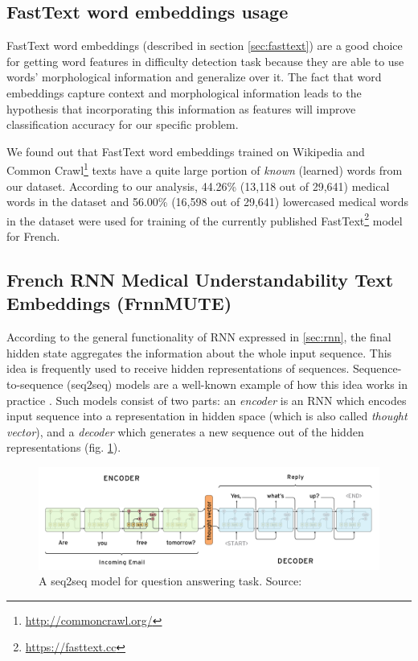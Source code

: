 \subsection{FastText word embeddings usage}

FastText word embeddings (described in section \ref{sec:fasttext}) are a good choice for getting word features in difficulty detection task because they are able to use words' morphological information and generalize over it. The fact that word embeddings capture context and morphological information leads to the hypothesis that incorporating this information as features will improve classification accuracy for our specific problem. 

We found out that FastText word embeddings trained on Wikipedia and Common Crawl\footnote{\url{http://commoncrawl.org/}} texts have a quite large portion of \textit{known} (learned) words from our dataset.
According to our analysis, 44.26\% (13,118 out of 29,641) medical words in the dataset and 56.00\% (16,598 out of 29,641) lowercased medical words in the dataset were used for training of the currently published FastText\footnote{\url{https://fasttext.cc}} model for French.

\subsection{French RNN Medical Understandability Text Embeddings (FrnnMUTE)}
\label{sec:frnnmute-learning}

According to the general functionality of RNN expressed in \ref{sec:rnn}, the final hidden state aggregates the information about the whole input sequence. This idea is frequently used to receive hidden representations of sequences. Sequence-to-sequence (seq2seq) models are a well-known example of how this idea works in practice \citep{Sutskever-NIPS2014}. Such models consist of two parts: an \textit{encoder} is an RNN which encodes input sequence into a representation in hidden space (which is also called \textit{thought vector}), and a \textit{decoder} which generates a new sequence out of the hidden representations (fig. \ref{fig:seq2seq}). 

\begin{figure}[h]
    \centering
    \includegraphics[width=14cm]{Images/seq2seq.png}
    \caption{A seq2seq model for question answering task. Source: \citep{Britz-2016}}
    \label{fig:seq2seq}
\end{figure} 

